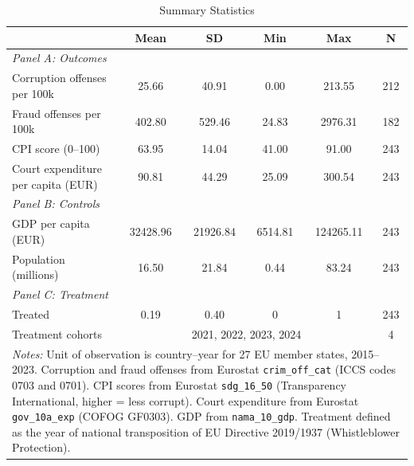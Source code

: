 \begin{table}[htbp]
\centering
\caption{Summary Statistics}
\label{tab:sumstats}
\begin{tabular}{lccccc}
\hline\hline
 & Mean & SD & Min & Max & N \\
\hline
\multicolumn{6}{l}{\textit{Panel A: Outcomes}} \\[3pt]
Corruption offenses per 100k & 25.66 & 40.91 & 0.00 & 213.55 & 212 \\
Fraud offenses per 100k & 402.80 & 529.46 & 24.83 & 2976.31 & 182 \\
CPI score (0--100) & 63.95 & 14.04 & 41.00 & 91.00 & 243 \\
Court expenditure per capita (EUR) & 90.81 & 44.29 & 25.09 & 300.54 & 243 \\
\hline
\multicolumn{6}{l}{\textit{Panel B: Controls}} \\[3pt]
GDP per capita (EUR) & 32428.96 & 21926.84 & 6514.81 & 124265.11 & 243 \\
Population (millions) & 16.50 & 21.84 & 0.44 & 83.24 & 243 \\
\hline
\multicolumn{6}{l}{\textit{Panel C: Treatment}} \\[3pt]
Treated & 0.19 & 0.40 & 0 & 1 & 243 \\
Treatment cohorts & \multicolumn{4}{c}{2021, 2022, 2023, 2024} & 4 \\
\hline\hline
\multicolumn{6}{p{0.9\textwidth}}{\footnotesize \textit{Notes:} Unit of observation is country--year for 27 EU member states, 2015--2023. Corruption and fraud offenses from Eurostat \texttt{crim\_off\_cat} (ICCS codes 0703 and 0701). CPI scores from Eurostat \texttt{sdg\_16\_50} (Transparency International, higher = less corrupt). Court expenditure from Eurostat \texttt{gov\_10a\_exp} (COFOG GF0303). GDP from \texttt{nama\_10\_gdp}. Treatment defined as the year of national transposition of EU Directive 2019/1937 (Whistleblower Protection).} \\
\end{tabular}
\end{table}
